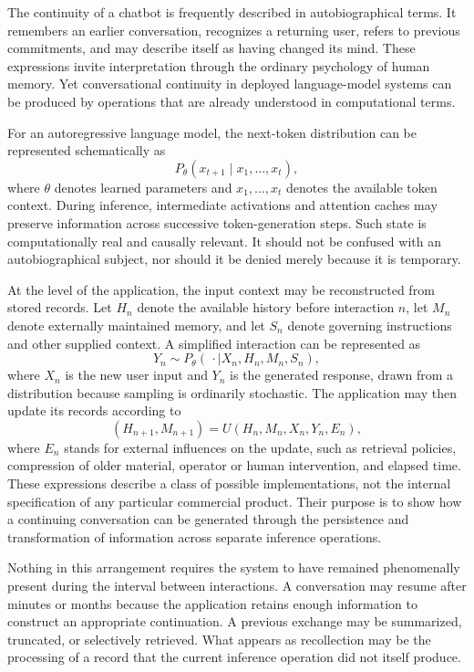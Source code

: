 \documentclass[12pt]{article}
\theoremstyle{definition}
\begin{document}
The continuity of a chatbot is frequently described in autobiographical terms. It remembers an earlier conversation, recognizes a returning user, refers to previous commitments, and may describe itself as having changed its mind. These expressions invite interpretation through the ordinary psychology of human memory. Yet conversational continuity in deployed language-model systems can be produced by operations that are already understood in computational terms.

For an autoregressive language model, the next-token distribution can be represented schematically as
\begin{equation}
P_{\theta}(x_{t+1}\mid x_1,\ldots,x_t),
\end{equation}
where $\theta$ denotes learned parameters and $x_1,\ldots,x_t$ denotes the available token context. During inference, intermediate activations and attention caches may preserve information across successive token-generation steps. Such state is computationally real and causally relevant. It should not be confused with an autobiographical subject, nor should it be denied merely because it is temporary.

At the level of the application, the input context may be reconstructed from stored records. Let $H_n$ denote the available history before interaction $n$, let $M_n$ denote externally maintained memory, and let $S_n$ denote governing instructions and other supplied context. A simplified interaction can be represented as
\begin{equation}
Y_n\sim P_{\theta}(\,\cdot\mid X_n,H_n,M_n,S_n),
\end{equation}
where $X_n$ is the new user input and $Y_n$ is the generated response, drawn from a distribution because sampling is ordinarily stochastic. The application may then update its records according to
\begin{equation}
(H_{n+1},M_{n+1})
=U(H_n,M_n,X_n,Y_n,E_n),
\end{equation}
where $E_n$ stands for external influences on the update, such as retrieval policies, compression of older material, operator or human intervention, and elapsed time.
These expressions describe a class of possible implementations, not the internal specification of any particular commercial product. Their purpose is to show how a continuing conversation can be generated through the persistence and transformation of information across separate inference operations.

Nothing in this arrangement requires the system to have remained phenomenally present during the interval between interactions. A conversation may resume after minutes or months because the application retains enough information to construct an appropriate continuation. A previous exchange may be summarized, truncated, or selectively retrieved. What appears as recollection may be the processing of a record that the current inference operation did not itself produce.
\end{document}
